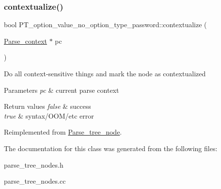 \subsubsection{\texorpdfstring{contextualize()}{contextualize()}}
{\footnotesize\ttfamily bool P\+T\+\_\+option\+\_\+value\+\_\+no\+\_\+option\+\_\+type\+\_\+password\+::contextualize (\begin{DoxyParamCaption}\item[{\mbox{\hyperlink{structParse__context}{Parse\+\_\+context}} $\ast$}]{pc }\end{DoxyParamCaption})\hspace{0.3cm}{\ttfamily [virtual]}}

Do all context-\/sensitive things and mark the node as contextualized


\begin{DoxyParams}{Parameters}
{\em pc} & current parse context\\
\hline
\end{DoxyParams}

\begin{DoxyRetVals}{Return values}
{\em false} & success \\
\hline
{\em true} & syntax/\+O\+O\+M/etc error \\
\hline
\end{DoxyRetVals}


Reimplemented from \mbox{\hyperlink{classParse__tree__node_a22d93524a537d0df652d7efa144f23da}{Parse\+\_\+tree\+\_\+node}}.



The documentation for this class was generated from the following files\+:\begin{DoxyCompactItemize}
\item 
parse\+\_\+tree\+\_\+nodes.\+h\item 
parse\+\_\+tree\+\_\+nodes.\+cc\end{DoxyCompactItemize}
